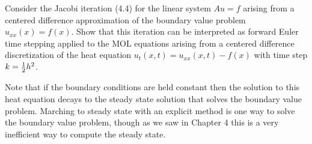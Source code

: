 

Consider the Jacobi iteration (4.4) for the linear system $Au=f$ arising
from a centered difference approximation of the boundary value problem
$u_{xx}(x) = f(x)$. Show that this iteration can be interpreted as forward
Euler time stepping applied to the MOL equations arising from a centered
difference discretization of the heat equation $u_t(x,t) = u_{xx}(x,t) -
f(x)$ with time step $k = \frac{1}{2} h^2$. 

Note that if the boundary conditions are held constant then the solution to
this heat equation decays to the steady state solution that solves the
boundary value problem.  Marching to steady state with an explicit method
is one way to solve the boundary value problem, though as we saw in Chapter
4 this is a very inefficient way to compute the steady state.

